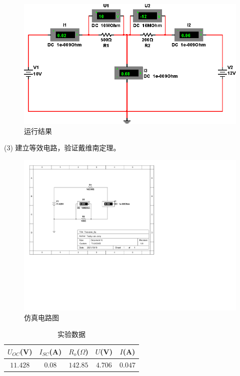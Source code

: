 \documentclass[12pt]{SEU-Circuit-Report}
\begin{document}
            \emptyline
            \expsimulate

            \begin{figure}[htbp]
                \centering
                \includegraphics[width=.8\linewidth]{fig/exp4_result.eps}
                \caption{运行结果}
                \label{fig:4result}
            \end{figure}

            \newpage
            
            (3) 建立等效电路，验证戴维南定理。
            \begin{figure}[htbp]
                \centering
                \includegraphics[width=.8\linewidth]{Thevenin_Eq.pdf}
                \caption{仿真电路图}
                \label{fig:5circuit}
            \end{figure}

            \begin{table}[htbp]
                \centering
                \begin{tabular}{ccccc}
                    \toprule
                    $U_{OC}$(V) & $I_{SC}$(A) & $R_o$($\Omega$) & $U$(V) & $I$(A) \\
                    \midrule
                    $11.428$ & $0.08$ & $142.85$ & $4.706$ & $0.047$ \\
                    \bottomrule
                \end{tabular}
                \caption{实验数据}
                \label{tab:4data}
            \end{table}
            
\end{document}
